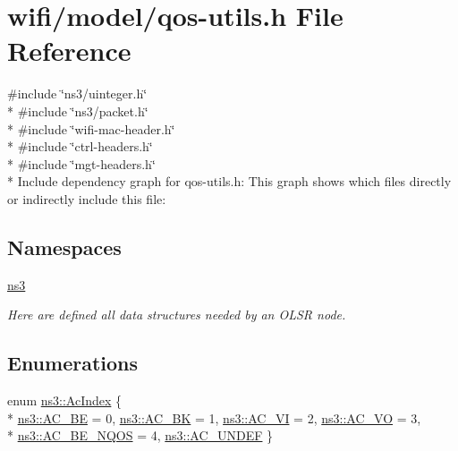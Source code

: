 \hypertarget{qos-utils_8h}{}\section{wifi/model/qos-\/utils.h File Reference}
\label{qos-utils_8h}
{\ttfamily \#include \char`\"{}ns3/uinteger.\+h\char`\"{}}\\*
{\ttfamily \#include \char`\"{}ns3/packet.\+h\char`\"{}}\\*
{\ttfamily \#include \char`\"{}wifi-\/mac-\/header.\+h\char`\"{}}\\*
{\ttfamily \#include \char`\"{}ctrl-\/headers.\+h\char`\"{}}\\*
{\ttfamily \#include \char`\"{}mgt-\/headers.\+h\char`\"{}}\\*
Include dependency graph for qos-\/utils.h\+:
This graph shows which files directly or indirectly include this file\+:
\subsection*{Namespaces}
\begin{DoxyCompactItemize}
\item 
 \hyperlink{namespacens3}{ns3}
\begin{DoxyCompactList}\small\item\em Here are defined all data structures needed by an O\+L\+SR node. \end{DoxyCompactList}\end{DoxyCompactItemize}
\subsection*{Enumerations}
\begin{DoxyCompactItemize}
\item 
enum \hyperlink{group__wifi_gab422b4562ba272b39a9b6bca3513f3ac}{ns3\+::\+Ac\+Index} \{ \\*
\hyperlink{group__wifi_ggab422b4562ba272b39a9b6bca3513f3aca136016fc12611734060b599355503c29}{ns3\+::\+A\+C\+\_\+\+BE} = 0, 
\hyperlink{group__wifi_ggab422b4562ba272b39a9b6bca3513f3aca53e99420c645076e74307112d73eb38b}{ns3\+::\+A\+C\+\_\+\+BK} = 1, 
\hyperlink{group__wifi_ggab422b4562ba272b39a9b6bca3513f3aca1c60bd99c5ede59bb50b91182cb81d0f}{ns3\+::\+A\+C\+\_\+\+VI} = 2, 
\hyperlink{group__wifi_ggab422b4562ba272b39a9b6bca3513f3aca147b7f007ca5459e52ee93d1ebe83639}{ns3\+::\+A\+C\+\_\+\+VO} = 3, 
\\*
\hyperlink{group__wifi_ggab422b4562ba272b39a9b6bca3513f3aca0ed29144b73a7cd671df98db388893d2}{ns3\+::\+A\+C\+\_\+\+B\+E\+\_\+\+N\+Q\+OS} = 4, 
\hyperlink{group__wifi_ggab422b4562ba272b39a9b6bca3513f3aca5cd2787988e927218889c6b7bb0901c3}{ns3\+::\+A\+C\+\_\+\+U\+N\+D\+EF}
 \}
\end{DoxyCompactItemize}
